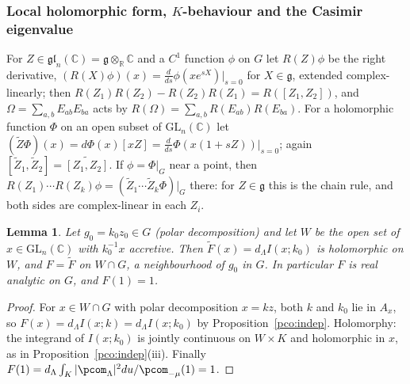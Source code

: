 \documentclass[10pt]{amsart}
\newtheorem{lemma}[theorem]{Lemma}
\theoremstyle{definition}
\theoremstyle{remark}
\newcommand{\C}{\mathbb C}
\newcommand{\R}{\mathbb R}
\begin{document}
\subsubsection{Local holomorphic form, $K$-behaviour and the Casimir eigenvalue}\label{pco:ss-casimir}
For $Z\in\mathfrak{gl}_n(\C)=\mathfrak g\otimes_\R\C$ and a $C^1$ function $\phi$ on $G$ let $R(Z)\phi$ be
the right derivative, $(R(X)\phi)(x)=\frac d{ds}\phi(xe^{sX})|_{s=0}$ for $X\in\mathfrak g$, extended
complex-linearly; then $R(Z_1)R(Z_2)-R(Z_2)R(Z_1)=R([Z_1,Z_2])$, and $\Omega=\sum_{a,b}E_{ab}E_{ba}$
acts by $R(\Omega)=\sum_{a,b}R(E_{ab})R(E_{ba})$. For a holomorphic function $\Phi$ on an open
subset of $\mathrm{GL}_n(\C)$ let $(\widetilde Z\Phi)(x)=d\Phi(x)[xZ]=\frac d{ds}\Phi(x(1+sZ))|_{s=0}$;
again $[\widetilde Z_1,\widetilde Z_2]=\widetilde{[Z_1,Z_2]}$. If $\phi=\Phi|_G$ near a point, then
$R(Z_1)\cdots R(Z_k)\phi=(\widetilde Z_1\cdots\widetilde Z_k\Phi)|_G$ there: for $Z\in\mathfrak g$ this is
the chain rule, and both sides are complex-linear in each $Z_i$.

\begin{lemma}\label{pco:local}
Let $g_0=k_0z_0\in G$ \textup(polar decomposition\textup) and let $W$ be the open set of
$x\in\mathrm{GL}_n(\C)$ with $k_0^{-1}x$ accretive. Then $\widetilde F(x)=d_\Lambda I(x;k_0)$ is
holomorphic on $W$, and $F=\widetilde F$ on $W\cap G$, a neighbourhood of $g_0$ in $G$. In particular
$F$ is real analytic on $G$, and $F(1)=1$.
\end{lemma}
\begin{proof}
For $x\in W\cap G$ with polar decomposition $x=kz$, both $k$ and $k_0$ lie in $A_x$, so
$F(x)=d_\Lambda I(x;k)=d_\Lambda I(x;k_0)$ by Proposition~\ref{pco:indep}. Holomorphy: the integrand
of $I(x;k_0)$ is jointly continuous on $W\times K$ and holomorphic in $x$, as in
Proposition~\ref{pco:indep}(iii). Finally $F(1)=d_\Lambda\int_K|\pcom_\Lambda|^2du/\pcom_{-\mu}(1)=1$.
\end{proof}
\end{document}
